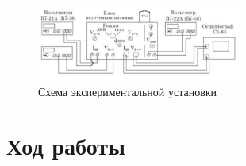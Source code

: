 \documentclass[a4paper,12pt]{article}
\begin{document}
\begin{figure}[H]
\begin{center}
\includegraphics[width = 0.6\textwidth]{scheme.jpg}
\caption{Схема экспериментальной установки}
\end{center}
\end{figure}

\section*{Ход работы}
\end{document}
